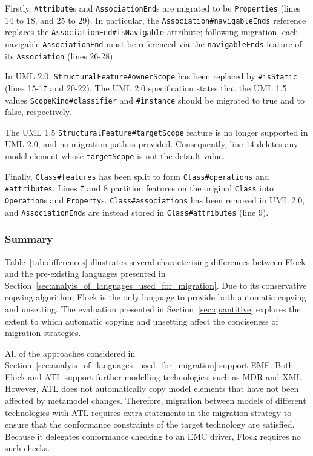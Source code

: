 Firstly, \texttt{At\-tr\-ib\-ut\-e}s and \texttt{As\-so\-ci\-at\-i\-onEn\-d}s are migrated to be \texttt{Pr\-o\-pe\-rt\-ies} (lines 14 to 18, and 25 to 29). In particular, the \texttt{As\-so\-ci\-at\-i\-on\#na\-vi\-ga\-b\-leEn\-ds} reference replaces the \texttt{As\-so\-ci\-at\-i\-onE\-nd\#isN\-av\-ig\-ab\-le} attribute; following migration, each navigable \texttt{As\-so\-ci\-at\-i\-onE\-nd} must be referenced via the \texttt{na\-vi\-ga\-bl\-eEn\-ds} feature of its \texttt{As\-so\-ci\-at\-ion} (lines 26-28).

In UML 2.0, \texttt{St\-ru\-ct\-ur\-alFe\-at\-ur\-e\#o\-wn\-er\-Sc\-op\-e} has been replaced by \texttt{\#i\-sS\-ta\-ti\-c} (lines 15-17 and 20-22). The UML 2.0 specification states that the UML 1.5 values \texttt{Sc\-op\-eKi\-nd\#cl\-as\-si\-fi\-er} and \texttt{\#i\-ns\-ta\-nce} should be migrated to true and to false, respectively. 

The UML 1.5 \texttt{St\-ru\-ct\-ur\-alFe\-at\-ur\-e\#t\-ar\-g\-et\-Sc\-op\-e} feature is no longer supported in UML 2.0, and no migration path is provided. Consequently, line 14 deletes any model element whose \texttt{t\-ar\-g\-et\-Sc\-op\-e} is not the default value.

Finally, \texttt{C\-la\-ss\#fe\-at\-ur\-es} has been split to form \texttt{C\-la\-ss\#op\-er\-at\-io\-ns} and \texttt{\#at\-tr\-ib\-ut\-es}. Lines 7 and 8 partition features on the original \texttt{Cl\-a\-ss} into \texttt{Op\-er\-at\-io\-n}s and \texttt{Pr\-op\-er\-ty}s. \texttt{Cl\-as\-s\#a\-ss\-oc\-ia\-ti\-on\-s} has been removed in UML 2.0, and \texttt{As\-so\-ci\-at\-i\-onEn\-d}s are instead stored in \texttt{Cl\-a\-ss\#at\-tr\-ib\-ut\-es} (line 9).


\subsubsection{Summary}
Table~\ref{tab:differences} illustrates several characterising differences between Flock and the pre-existing languages presented in Section~\ref{sec:analyis_of_languages_used_for_migration}. Due to its conservative copying algorithm, Flock is the only language to provide both automatic copying and unsetting. The evaluation presented in Section~\ref{sec:quantitive} explores the extent to which automatic copying and unsetting affect the conciseness of migration strategies.

All of the approaches considered in Section~\ref{sec:analyis_of_languages_used_for_migration} support EMF. Both Flock and ATL support further modelling technologies, such as MDR and XML. However, ATL does not automatically copy model elements that have not been affected by metamodel changes. Therefore, migration between models of different technologies with ATL requires extra statements in the migration strategy to ensure that the conformance constraints of the target technology are satisfied. Because it delegates conformance checking to an EMC driver, Flock requires no such checks.

